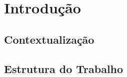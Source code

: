 
\chapter{Introdução}
\label{cap:introducao}

\section{Contextualização}

\section{Estrutura do Trabalho}




